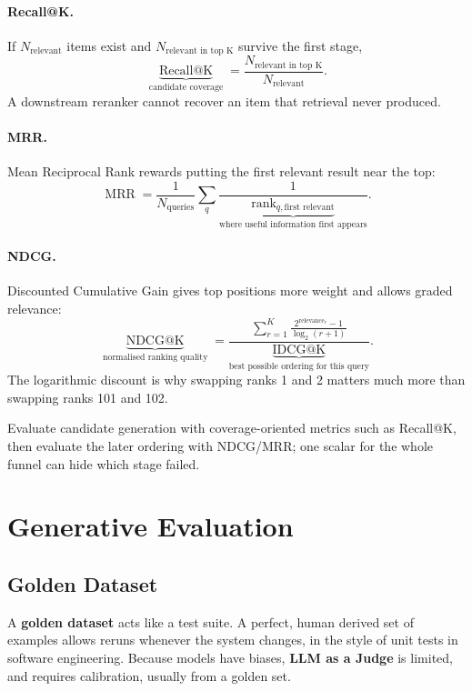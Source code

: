 \paragraph{Recall@K.}
If $N_{\text{relevant}}$ items exist and $N_{\text{relevant in top K}}$ survive the first stage,
\[
    \underbrace{\operatorname{Recall@K}}_{\text{candidate coverage}}
    =
    \frac{N_{\text{relevant in top K}}}{N_{\text{relevant}}}.
\]
A downstream reranker cannot recover an item that retrieval never produced.

\paragraph{MRR.}
Mean Reciprocal Rank rewards putting the first relevant result near the top:
\[
    \operatorname{MRR}
    =
    \frac{1}{N_{\text{queries}}}
    \sum_q
    \frac{1}{\underbrace{\operatorname{rank}_{q,\text{first relevant}}}_{\text{where useful information first appears}}}.
\]

\paragraph{NDCG.}
Discounted Cumulative Gain gives top positions more weight and allows graded relevance:
\[
    \underbrace{\operatorname{NDCG@K}}_{\text{normalised ranking quality}}
    =
    \frac{
    \sum_{r=1}^{K}
    \frac{2^{\operatorname{relevance}_r}-1}{\log_2(r+1)}
    }{
    \underbrace{\operatorname{IDCG@K}}_{\text{best possible ordering for this query}}
    }.
\]
The logarithmic discount is why swapping ranks 1 and 2 matters much more than swapping ranks 101 and 102.

\begin{calloutpractical}
Evaluate candidate generation with coverage-oriented metrics such as Recall@K, then evaluate the later ordering with NDCG/MRR; one scalar for the whole funnel can hide which stage failed.
\end{calloutpractical}

\section{Generative Evaluation}
\label{sec:evaluation-generative-and-rag-evaluation}
\subsection{Golden Dataset}
A \textbf{golden dataset} acts like a test suite. 
A perfect, human derived set of examples allows reruns whenever the system changes, in the style of unit tests in software engineering.
Because models have biases, \textbf{LLM as a Judge} is limited, and requires calibration, usually from a golden set.

